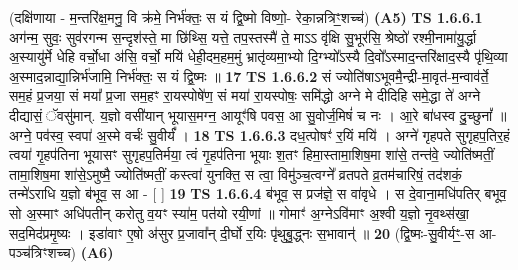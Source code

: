 \documentclass[17pt]{extarticle}
\begin{document}
                  \newline
                      (दक्षि॑णाया - म॒न्तरि॑क्ष॒मनु॒ वि क्र॑मे॒ निर्भ॑क्तः॒ स यं द्वि॒ष्मो विष्णो॒- रेका॒न्नत्रिꣳ॒॒शच्च॑)  \textbf{(A5)} \newline \newline
                                        \textbf{ TS 1.6.6.1} \newline
                  अग॑न्म॒ सुवः॒ सुव॑रगन्म स॒न्दृश॑स्ते॒ मा छि॑थ्सि॒ यत्ते॒ तप॒स्तस्मै॑ ते॒ माऽऽ वृ॑क्षि सु॒भूर॑सि॒ श्रेष्ठो॑ रश्मी॒नामा॑यु॒र्द्धा अ॒स्यायु॑र्मे धेहि वर्चो॒धा अ॑सि॒ वर्चो॒ मयि॑ धेही॒दम॒हम॒मुं भ्रातृ॑व्यमा॒भ्यो दि॒ग्भ्यो᳚ऽस्यै दि॒वो᳚ऽस्माद॒न्तरि॑क्षाद॒स्यै पृ॑थि॒व्या अ॒स्माद॒न्नाद्या॒न्निर्भ॑जामि॒ निर्भ॑क्तः॒ स यं द्वि॒ष्मः ॥ \textbf{  17} \newline
                  \newline
                                \textbf{ TS 1.6.6.2} \newline
                  सं ज्योति॑षाऽभूवमै॒न्द्री-मा॒वृत॑-म॒न्वाव॑र्ते॒ सम॒हं प्र॒जया॒ सं मया᳚ प्र॒जा सम॒हꣳ रा॒यस्पोषे॑ण॒ सं मया॑ रा॒यस्पोषः॒ समि॑द्धो अग्ने मे दीदिहि समे॒द्धा ते॑ अग्ने दीद्यासं॒ ॅवसु॑मान्. य॒ज्ञो वसी॑यान् भूयास॒मग्न॒ आयूꣳ॑षि पवस॒ आ सु॒वोर्ज॒मिषं॑ च नः । आ॒रे बा॑धस्व दु॒च्छुनां᳚ ॥ अग्ने॒ पव॑स्व॒ स्वपा॑ अ॒स्मे वर्चः॑ सु॒वीर्यं᳚ । \textbf{  18} \newline
                  \newline
                                \textbf{ TS 1.6.6.3} \newline
                  दध॒त्पोषꣳ॑ र॒यिं मयि॑ । अग्ने॑ गृहपते सुगृहप॒तिर॒हं त्वया॑ गृ॒हप॑तिना भूयासꣳ सुगृहप॒तिर्मया॒ त्वं गृ॒हप॑तिना भूयाः श॒तꣳ हिमा॒स्तामा॒शिष॒मा शा॑से॒ तन्त॑वे॒ ज्योति॑ष्मतीं॒ तामा॒शिष॒मा शा॑से॒ऽमुष्मै॒ ज्योति॑ष्मतीं॒ कस्त्वा॑ युनक्ति॒ स त्वा॒ विमु॑ञ्च॒त्वग्ने᳚ व्रतपते व्र॒तम॑चारिषं॒ तद॑शकं॒ तन्मे॑ऽराधि य॒ज्ञो ब॑भूव॒ स आ - [ ] \textbf{  19} \newline
                  \newline
                                \textbf{ TS 1.6.6.4} \newline
                  ब॑भूव॒ स प्रज॑ज्ञे॒ स वा॑वृधे । स दे॒वाना॒मधि॑पतिर् बभूव॒ सो अ॒स्माꣳ अधि॑पतीन् करोतु व॒यꣳ स्या॑म॒ पत॑यो रयी॒णां ॥ गोमाꣳ॑ अ॒ग्नेऽवि॑माꣳ अ॒श्वी य॒ज्ञो नृ॒वथ्स॑खा॒ सद॒मिद॑प्रमृ॒ष्यः । इडा॑वाꣳ ए॒षो अ॑सुर प्र॒जावा᳚न् दी॒र्घो र॒यिः पृ॑थुबु॒द्ध्नः स॒भावान्॑ ॥ \textbf{  20} \newline
                  \newline
                      (द्वि॒ष्मः-सु॒वीर्यꣳ॒॒-स आ-पञ्च॑त्रिꣳशच्च)  \textbf{(A6)} \newline \newline
\end{document}
